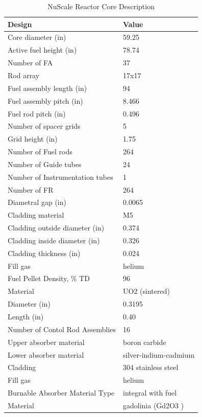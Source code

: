 \documentclass[10pt,a4paper]{article}
\begin{document}
\begin{table} [htbp]
\begin{center}

\caption{NuScale Reactor Core Description \cite{nuscale_chapter_2018}}
\label{Nutable}
\begin{tabular}{l     l}
\hline 
Design 		&Value \\ 
\hline 
Core diameter (in)			&59.25\\
Active fuel height (in)	&78.74\\

Number of FA 		&  37\\
Rod array   			&17x17\\
Fuel assembly length (in) &  94\\
Fuel assembly pitch (in)	&8.466\\
Fuel rod pitch (in)&0.496\\
Number of spacer grids&5\\
Grid height (in)&1.75\\
Number of Fuel rods&264\\
Number of Guide tubes&24\\
Number of Instrumentation tubes&1\\
\hline 
Number of FR&264\\
Diametral gap (in)&0.0065\\
Cladding material&M5\\
Cladding outside diameter (in)&0.374\\
Cladding inside diameter (in)&0.326\\
Cladding thickness (in)&0.024\\
Fill gas&helium\\
\hline 
Fuel Pellet Density, \% TD&96\\
Material&UO2 (sintered)\\
Diameter (in)&0.3195\\
Length (in) &0.40\\
\hline 
Number of Contol Rod Assemblies&16                              \\
Upper absorber material&boron carbide              \\
Lower absorber material&silver-indium-cadmium \\
Cladding&304 stainless steel      \\
Fill gas&helium                        \\
\hline 
Burnable Absorber Material Type&integral with fuel         \\
Material &gadolinia (Gd2O3 )      \\

\end{tabular}
\end{center}
\end{table}
\end{document}
